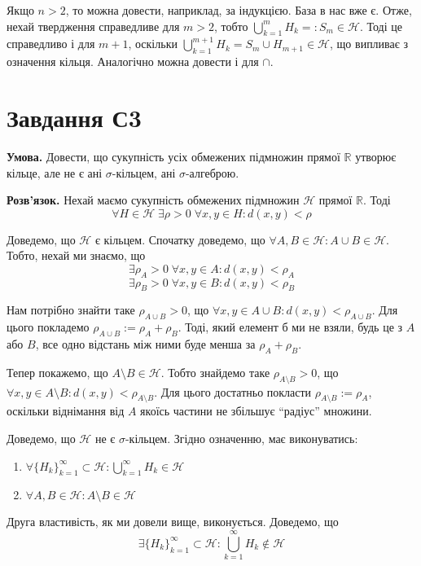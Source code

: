 \documentclass[12pt]{extarticle}
\begin{document}
Якщо $n>2$, то можна довести, наприклад, за індукцією. База в нас вже є. Отже, нехай твердження справедливе для $m>2$, тобто $\bigcup_{k=1}^m H_k =: S_m \in \mathcal{H}$. Тоді це справедливо і для $m+1$, оскільки $\bigcup_{k=1}^{m+1} H_k = S_m \cup H_{m+1} \in \mathcal{H}$, що випливає з означення кільця. Аналогічно можна довести і для $\cap$.

\section*{Завдання С3}

\textbf{Умова.} Довести, що сукупність усіх обмежених підмножин прямої $\mathbb{R}$ утворює кільце, але не є ані $\sigma$-кільцем, ані $\sigma$-алгеброю. 

\textbf{Розв'язок.} Нехай маємо сукупність обмежених підмножин $\mathcal{H}$ прямої $\mathbb{R}$. Тоді
\[
\forall H \in \mathcal{H} \; \exists \rho > 0 \; \forall x, y \in H: d(x,y) < \rho 
\]

Доведемо, що $\mathcal{H}$ є кільцем. Спочатку доведемо, що $\forall A, B \in \mathcal{H}: A \cup B \in \mathcal{H}$. Тобто, нехай ми знаємо, що
\[
\exists \rho_A > 0 \; \forall x,y \in A: d(x,y) < \rho_A
\]
\[
\exists \rho_B > 0 \; \forall x,y \in B: d(x,y) < \rho_B
\]

Нам потрібно знайти таке $\rho_{A \cup B} > 0$, що $\forall x,y \in A \cup B: d(x,y) < \rho_{A \cup B}$. Для цього покладемо $\rho_{A \cup B} := \rho_A + \rho_B$. Тоді, який елемент б ми не взяли, будь це з $A$ або $B$, все одно відстань між ними буде менша за $\rho_A + \rho_B$. 

Тепер покажемо, що $A \setminus B \in \mathcal{H}$. Тобто знайдемо таке $\rho_{A\setminus B} > 0$, що $\forall x,y \in A \setminus B: d(x,y)<\rho_{A \setminus B}$. Для цього достатньо покласти $\rho_{A \setminus B} := \rho_A$, оскільки віднімання від $A$ якоїсь частини не збільшує ``радіус'' множини. 

Доведемо, що $\mathcal{H}$ не є $\sigma$-кільцем. Згідно означенню, має виконуватись:
\begin{enumerate}
    \item $\forall \{H_k\}_{k=1}^{\infty} \subset \mathcal{H}: \bigcup_{k=1}^{\infty}H_k \in \mathcal{H}$
    \item $\forall A,B \in \mathcal{H}: A \setminus B \in \mathcal{H}$
\end{enumerate}

Друга властивість, як ми довели вище, виконується. Доведемо, що
\[
\exists \{H_k\}_{k=1}^{\infty} \subset \mathcal{H}: \bigcup_{k=1}^{\infty} H_k \notin \mathcal{H}
\]
\end{document}
